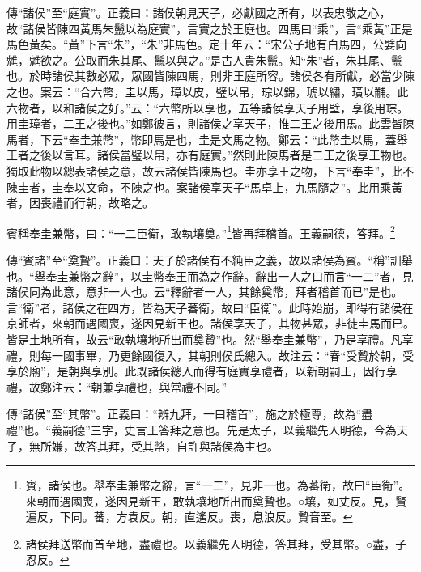 {\noindent\zhuan{}\fzbyks 傳“諸侯”至“庭實”。正義曰：諸侯朝見天子，必獻國之所有，以表忠敬之心，故“諸侯皆陳四黃馬朱鬛以為庭實”，言實之於王庭也。四馬曰“乘”，言“乘黃”正是馬色黃矣。“黃”下言“朱”，“朱”非馬色。定十年云：“宋公子地有白馬四，公嬖向魋，魋欲之。公取而朱其尾、鬛以與之。”是古人貴朱鬛。知“朱”者，朱其尾、鬛也。於時諸侯其數必眾，眾國皆陳四馬，則非王庭所容。諸侯各有所獻，必當少陳之也。案云：“合六幣，圭以馬，璋以皮，璧以帛，琮以錦，琥以繡，璜以黼。此六物者，以和諸侯之好。”云：“六幣所以享也，五等諸侯享天子用壁，享後用琮。用圭璋者，二王之後也。”如鄭彼言，則諸侯之享天子，惟二王之後用馬。此雲皆陳馬者，下云“奉圭兼幣”，幣即馬是也，圭是文馬之物。鄭云：“此幣圭以馬，蓋舉王者之後以言耳。諸侯當璧以帛，亦有庭實。”然則此陳馬者是二王之後享王物也。獨取此物以總表諸侯之意，故云諸侯皆陳馬也。圭亦享王之物，下言“奉圭”，此不陳圭者，圭奉以文命，不陳之也。案諸侯享天子“馬卓上，九馬隨之”。此用乘黃者，因喪禮而行朝，故略之。 \par}

賓稱奉圭兼幣，曰：“一二臣衛，敢執壤奠。”\footnote{賓，諸侯也。舉奉圭兼幣之辭，言“一二”，見非一也。為蕃衛，故曰“臣衛”。來朝而遇國喪，遂因見新王，敢執壤地所出而奠贄也。○壤，如丈反。見，賢遍反，下同。蕃，方袁反。朝，直遙反。喪，息浪反。贄音至。}皆再拜稽首。王義嗣德，答拜。\footnote{諸侯拜送幣而首至地，盡禮也。以義繼先人明德，答其拜，受其幣。○盡，子忍反。}

{\noindent\zhuan{}\fzbyks 傳“賓諸”至“奠贄”。正義曰：天子於諸侯有不純臣之義，故以諸侯為賓。“稱”訓舉也。“舉奉圭兼幣之辭”，以圭幣奉王而為之作辭。辭出一人之口而言“一二”者，見諸侯同為此意，意非一人也。云“釋辭者一人，其餘奠幣，拜者稽首而已”是也。言“衛”者，諸侯之在四方，皆為天子蕃衛，故曰“臣衛”。此時始崩，即得有諸侯在京師者，來朝而遇國喪，遂因見新王也。諸侯享天子，其物甚眾，非徒圭馬而已。皆是土地所有，故云“敢執壤地所出而奠贄”也。然“舉奉圭兼幣”，乃是享禮。凡享禮，則每一國事畢，乃更餘國復入，其朝則侯氏總入。故注云：“春“受贄於朝，受享於廟”，是朝與享別。此既諸侯總入而得有庭實享禮者，以新朝嗣王，因行享禮，故鄭注云：“朝兼享禮也，與常禮不同。” \par}

{\noindent\zhuan{}\fzbyks 傳“諸侯”至“其幣”。正義曰：“辨九拜，一曰稽首”，施之於極尊，故為“盡禮”也。“義嗣德”三字，史言王答拜之意也。先是太子，以義繼先人明德，今為天子，無所嫌，故答其拜，受其幣，自許與諸侯為主也。 \par}

